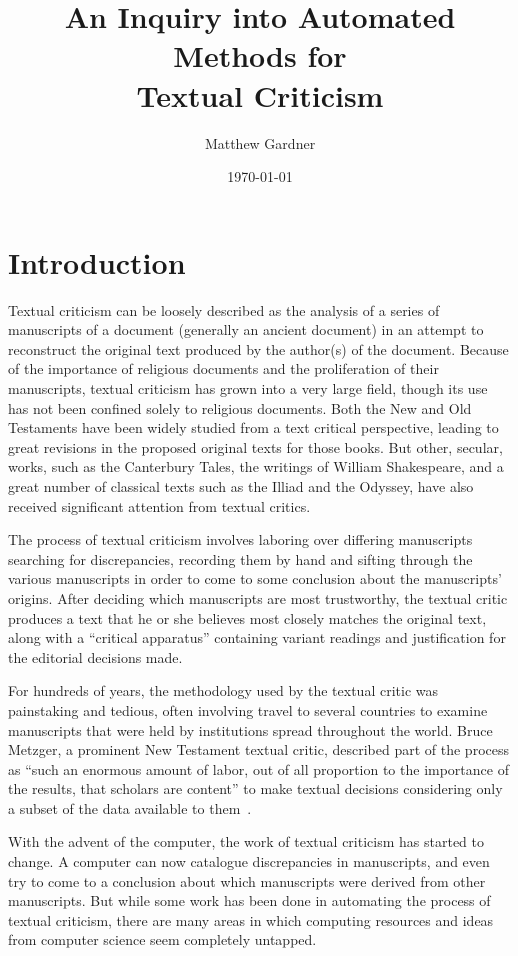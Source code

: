 \documentclass[onecolumn, 12pt]{article}
\title{An Inquiry into Automated Methods for\\Textual Criticism}
\author{Matthew Gardner}
\date{\today}
\begin{document}
\maketitle

\section{Introduction}
\label{sec:intro}

Textual criticism can be loosely described as the analysis of a series of
manuscripts of a document (generally an ancient document) in an attempt to
reconstruct the original text produced by the author(s) of the document.
Because of the importance of religious documents and the proliferation of their
manuscripts, textual criticism has grown into a very large field, though its
use has not been confined solely to religious documents.  Both the New and Old
Testaments have been widely studied from a text critical perspective, leading
to great revisions in the proposed original texts for those books.  But other,
secular, works, such as the Canterbury Tales, the writings of William
Shakespeare, and a great number of classical texts such as the Illiad and the
Odyssey, have also received significant attention from textual critics.

The process of textual criticism involves laboring over differing manuscripts
searching for discrepancies, recording them by hand and sifting through the
various manuscripts in order to come to some conclusion about the manuscripts'
origins.  After deciding which manuscripts are most trustworthy, the textual
critic produces a text that he or she believes most closely matches the
original text, along with a ``critical apparatus'' containing variant readings
and justification for the editorial decisions made.

For hundreds of years, the methodology used by the textual critic was
painstaking and tedious, often involving travel to several countries to examine
manuscripts that were held by institutions spread throughout the world.  Bruce
Metzger, a prominent New Testament textual critic, described part of the
process as ``such an enormous amount of labor, out of all proportion to the
importance of the results, that scholars are content'' to make textual
decisions considering only a subset of the data available to
them~\cite[p. 179]{metzger-1992-text-of-the-new-testament}.

With the advent of the computer, the work of textual criticism has started to
change.  A computer can now catalogue discrepancies in manuscripts, and even
try to come to a conclusion about which manuscripts were derived from other
manuscripts.  But while some work has been done in automating the process of
textual criticism, there are many areas in which computing resources and ideas
from computer science seem completely untapped.
\end{document}
